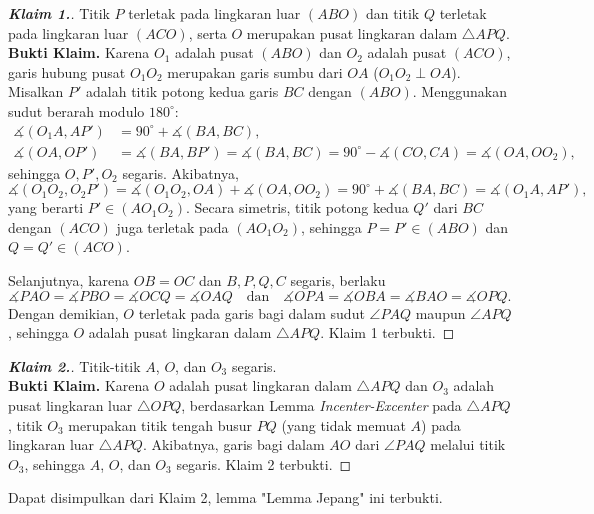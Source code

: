 \newpage
\begin{proof}[\textbf{Klaim 1.}] Titik $P$ terletak pada lingkaran luar $(ABO)$ dan titik $Q$ terletak pada lingkaran luar $(ACO)$, serta $O$ merupakan pusat lingkaran dalam $\triangle APQ$.\\
    \textbf{Bukti Klaim.} Karena $O_1$ adalah pusat $(ABO)$ dan $O_2$ adalah pusat $(ACO)$, garis hubung pusat $O_1O_2$ merupakan garis sumbu dari $OA$ ($O_1O_2 \perp OA$). Misalkan $P'$ adalah titik potong kedua garis $BC$ dengan $(ABO)$. Menggunakan sudut berarah modulo $180^\circ$:
    \begin{align*}
        \measuredangle(O_1A, AP') &= 90^\circ + \measuredangle(BA, BC), \\
        \measuredangle(OA, OP') &= \measuredangle(BA, BP') = \measuredangle(BA, BC) = 90^\circ - \measuredangle(CO, CA) = \measuredangle(OA, OO_2),
    \end{align*}
    sehingga $O, P', O_2$ segaris. Akibatnya,
    \[
        \measuredangle(O_1O_2, O_2P') = \measuredangle(O_1O_2, OA) + \measuredangle(OA, OO_2) = 90^\circ + \measuredangle(BA, BC) = \measuredangle(O_1A, AP'),
    \]
    yang berarti $P' \in (AO_1O_2)$. Secara simetris, titik potong kedua $Q'$ dari $BC$ dengan $(ACO)$ juga terletak pada $(AO_1O_2)$, sehingga $P = P' \in (ABO)$ dan $Q = Q' \in (ACO)$.

    Selanjutnya, karena $OB = OC$ dan $B, P, Q, C$ segaris, berlaku
    \[
        \measuredangle PAO = \measuredangle PBO = \measuredangle OCQ = \measuredangle OAQ \quad\text{dan}\quad \measuredangle OPA = \measuredangle OBA = \measuredangle BAO = \measuredangle OPQ.
    \]
    Dengan demikian, $O$ terletak pada garis bagi dalam sudut $\angle PAQ$ maupun $\angle APQ$, sehingga $O$ adalah pusat lingkaran dalam $\triangle APQ$. Klaim 1 terbukti.
\end{proof}
\hrulefill
\begin{proof}[\textbf{Klaim 2.}] Titik-titik $A$, $O$, dan $O_3$ segaris.\\
    \textbf{Bukti Klaim.} Karena $O$ adalah pusat lingkaran dalam $\triangle APQ$ dan $O_3$ adalah pusat lingkaran luar $\triangle OPQ$, berdasarkan Lemma \textit{Incenter-Excenter} pada $\triangle APQ$, titik $O_3$ merupakan titik tengah busur $PQ$ (yang tidak memuat $A$) pada lingkaran luar $\triangle APQ$. Akibatnya, garis bagi dalam $AO$ dari $\angle PAQ$ melalui titik $O_3$, sehingga $A$, $O$, dan $O_3$ segaris. Klaim 2 terbukti.
\end{proof}
Dapat disimpulkan dari Klaim 2, lemma "Lemma Jepang" ini terbukti.

